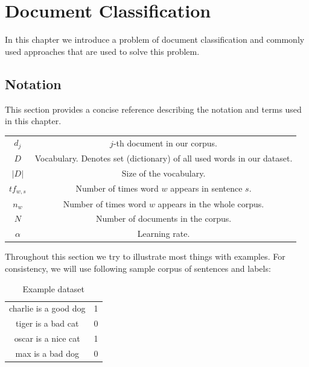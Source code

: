 \chapter{Document Classification}

    In this chapter we introduce a problem of document classification and commonly used approaches that are used to solve this problem.
    \* %
    

\section{Notation}

    This section provides a concise reference describing the notation and terms used in this chapter.
    
    \begin{table}[h]
        \centering
        \begin{tabular}{c c}
            $d_j$ & $j$-th document in our corpus.\\
            $D$ & Vocabulary. Denotes set (dictionary) of all used words in our dataset. \\
            $|D|$ & Size of the vocabulary. \\
            $tf_{w,s}$ & Number of times word $w$ appears in sentence $s$. \\
            $n_w$ & Number of times word $w$ appears in the whole corpus. \\
            $N$ & Number of documents in the corpus. \\
            $\alpha$ & Learning rate.
        \end{tabular}
    \end{table}
    
    Throughout this section we try to illustrate most things with examples. 
    For consistency, we will use following sample corpus of sentences and labels:
    
    \begin{table}[h]
        \centering
        \begin{tabular}{c|c}
        \hline
            charlie is a good dog & 1 \\
            tiger is a bad cat & 0 \\
            oscar is a nice cat & 1 \\
            max is a bad dog & 0 \\
        \end{tabular}
        \caption{Example dataset}
        \label{tab:example:dataset}

    \end{table}
    

